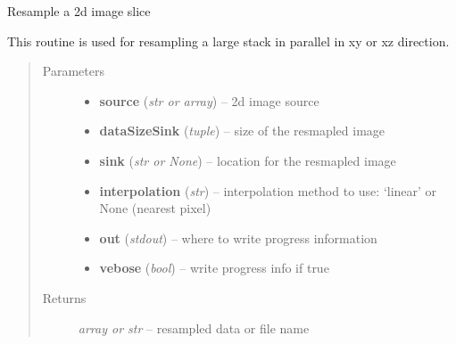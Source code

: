 \documentclass[letterpaper,10pt,english]{sphinxmanual}
\begin{document}

\begin{fulllineitems}
\label{api/ClearMap.Alignment:ClearMap.Alignment.Resampling.resampleXY}
Resample a 2d image slice

This routine is used for resampling a large stack in parallel in xy or xz direction.
\begin{quote}\begin{description}
\item[{Parameters}] \leavevmode\begin{itemize}
\item {} 
\textbf{source} (\emph{str or array}) --
2d image source

\item {} 
\textbf{dataSizeSink} (\emph{tuple}) --
size of the resmapled image

\item {} 
\textbf{sink} (\emph{str or None}) --
location for the resmapled image

\item {} 
\textbf{interpolation} (\emph{str}) --
interpolation method to use: `linear' or None (nearest pixel)

\item {} 
\textbf{out} (\emph{stdout}) --
where to write progress information

\item {} 
\textbf{vebose} (\emph{bool}) --
write progress info if true

\end{itemize}

\item[{Returns}] \leavevmode
\emph{array or str} --
resampled data or file name

\end{description}\end{quote}

\end{fulllineitems}

\end{document}
